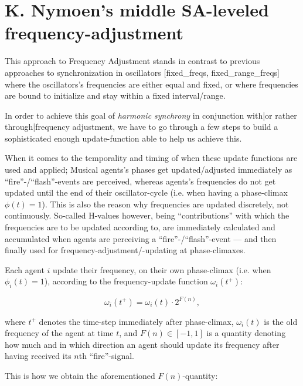 \section{K. Nymoen's middle SA-leveled frequency-adjustment}
\label{nymoen_freq_adjust}

This approach to Frequency Adjustment stands in contrast to previous approaches to synchronization in oscillators [fixed\_freqs, fixed\_range\_freqs] where the oscillators's frequencies are either equal and fixed, or where frequencies are bound to initialize and stay within a fixed interval/range.

In order to achieve this goal of \textit{harmonic synchrony} in conjunction with|or rather through|frequency adjustment, we have to go through a few steps to build a sophisticated enough update-function able to help us achieve this.

When it comes to the temporality and timing of when these update functions are used and applied; Musical agents's phases get updated/adjusted immediately as ``fire''-/``flash''-events are perceived, whereas agents's frequencies do not get updated until the end of their oscillator-cycle (i.e. when having a phase-climax $\phi(t)=1$). This is also the reason why frequencies are updated discretely, not continuously. So-called H-values however, being ``contributions'' with which the frequencies are to be updated according to, are immediately calculated and accumulated when agents are perceiving a ``fire''-/``flash''-event — and then finally used for frequency-adjustment/-updating at phase-climaxes.
		
Each agent $i$ update their frequency, on their own phase-climax (i.e. when $\phi_i(t)=1$), according to the frequency-update function $\omega_i(t^+)$:

\begin{equation}
	\omega_i(t^+) = \omega_i(t) \cdot 2^{F(n)},
\end{equation}

where $t^+$ denotes the time-step immediately after phase-climax, $\omega_i(t)$ is the old frequency of the agent at time $t$, and $F(n) \in [-1,1]$ is a quantity denoting how much and in which direction an agent should update its frequency after having received its $n$th ``fire''-signal.

This is how we obtain the aforementioned $F(n)$-quantity:


